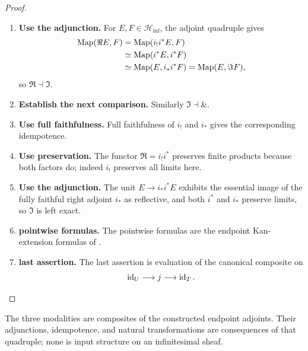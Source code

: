 \begin{proof}
\leavevmode
\begin{enumerate}[label=\textup{(\arabic*)}]
    \item \textbf{Use the adjunction.}
    For \(E,F\in\mathcal H_{\inf}\), the adjoint quadruple gives
    \[
    \begin{aligned}
        \operatorname{Map}(\Re E,F)
        &=\operatorname{Map}(i_!i^*E,F)
        \\
        &\simeq\operatorname{Map}(i^*E,i^*F)
        \\
        &\simeq\operatorname{Map}(E,i_*i^*F)
        =\operatorname{Map}(E,\Im F),
    \end{aligned}
    \]
    so \(\Re\dashv\Im\).

    \item \textbf{Establish the next comparison.}
    Similarly \(\Im\dashv\&\).

    \item \textbf{Use full faithfulness.}
    Full faithfulness of \(i_!\) and \(i_*\) gives the corresponding idempotence.

    \item \textbf{Use preservation.}
    The functor \(\Re=i_!i^*\) preserves finite products because both factors do; indeed
    \(i_!\) preserves all limits here.

    \item \textbf{Use the adjunction.}
    The unit \(E\to i_*i^*E\) exhibits the essential image of the fully faithful right adjoint
    \(i_*\) as reflective, and both \(i^*\) and \(i_*\) preserve limits, so
    \(\Im\) is left exact.

    \item \textbf{pointwise formulas.}
    The pointwise formulas are the endpoint Kan-extension formulas of
    .

    \item \textbf{last assertion.}
    The last assertion is evaluation of the canonical composite on
    \[
        \operatorname{id}_U\longrightarrow j\longrightarrow\operatorname{id}_T.
    \]
\end{enumerate}
\end{proof}

\begin{remark}
\label{rem:endpoint-cohesive-no-axiom}
The three modalities are composites of the constructed endpoint adjoints.
Their adjunctions, idempotence, and natural transformations are consequences of
that quadruple; none is input structure on an infinitesimal sheaf.
\end{remark}

